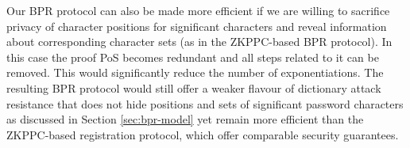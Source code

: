 Our \ac{BPR} protocol can also be made more efficient if we are willing to sacrifice privacy of character positions for significant characters and reveal information about corresponding character sets (as in the \ac{ZKPPC}-based \ac{BPR} protocol). 
In this case the proof \ac{PoS} becomes redundant and all steps related to it can be removed. 
This would significantly reduce the number of exponentiations. 
The resulting \ac{BPR} protocol would still offer a weaker flavour of dictionary attack resistance that does not hide positions and sets of significant password characters as discussed in Section \ref{sec:bpr-model} yet remain more efficient than the \ac{ZKPPC}-based registration protocol, which offer comparable security guarantees.
